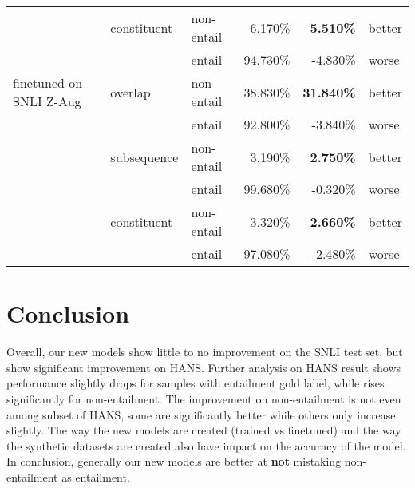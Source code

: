 \documentclass{article}
\begin{document}
\begin{table}[]
\begin{tabular}{lllrrl}
                                          & constituent         & non-entail          & 6.170\%                                & \textbf{5.510\%}                                & better        \\
                                          &                     & entail              & 94.730\%                               & -4.830\%                                        & worse         \\
        finetuned on SNLI Z-Aug          & overlap             & non-entail          & 38.830\%                               & \textbf{31.840\%}                               & better        \\
                                          &                     & entail              & 92.800\%                               & -3.840\%                                        & worse         \\
                                          & subsequence         & non-entail          & 3.190\%                                & \textbf{2.750\%}                                & better        \\
                                          &                     & entail              & 99.680\%                               & -0.320\%                                        & worse         \\
                                          & constituent         & non-entail          & 3.320\%                                & \textbf{2.660\%}                                & better        \\
                                          &                     & entail              & 97.080\%                               & -2.480\%                                        & worse        \\ \hline
    \end{tabular}
\end{table}


\section{Conclusion}

Overall, our new models show little to no improvement on the SNLI test set, but show significant improvement on HANS. Further analysis on HANS result shows performance slightly drops for samples with entailment gold label, while rises significantly for non-entailment.
The improvement on non-entailment is not even among subset of HANS, some are significantly better while others only increase slightly.
The way the new models are created (trained vs finetuned) and the way the synthetic datasets are created also have impact on the accuracy of the model.
In conclusion, generally our new models are better at \textbf{not} mistaking non-entailment as entailment.
\end{document}
